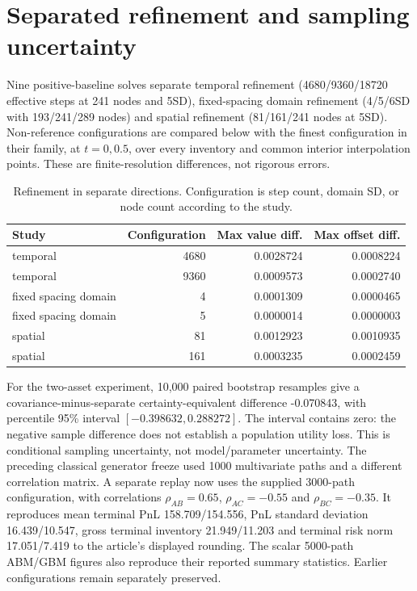 \section{Separated refinement and sampling uncertainty}
Nine positive-baseline solves separate temporal refinement (4680/9360/18720 effective steps at 241 nodes and 5SD), fixed-spacing domain refinement (4/5/6SD with 193/241/289 nodes) and spatial refinement (81/161/241 nodes at 5SD). Non-reference configurations are compared below with the finest configuration in their family, at $t=0,0.5$, over every inventory and common interior interpolation points. These are finite-resolution differences, not rigorous errors.
\begin{table}[ht]\centering\small
\begin{tabular}{lrrr}\toprule Study & Configuration & Max value diff. & Max offset diff.\\\midrule
temporal & 4680 & 0.0028724 & 0.0008224 \\
temporal & 9360 & 0.0009573 & 0.0002740 \\
fixed spacing domain & 4 & 0.0001309 & 0.0000465 \\
fixed spacing domain & 5 & 0.0000014 & 0.0000003 \\
spatial & 81 & 0.0012923 & 0.0010935 \\
spatial & 161 & 0.0003235 & 0.0002459 \\
\bottomrule\end{tabular}
\caption{Refinement in separate directions. Configuration is step count, domain SD, or node count according to the study.}
\end{table}
For the two-asset experiment, 10,000 paired bootstrap resamples give a covariance-minus-separate certainty-equivalent difference -0.070843, with percentile 95\% interval $[-0.398632,0.288272]$. The interval contains zero: the negative sample difference does not establish a population utility loss. This is conditional sampling uncertainty, not model/parameter uncertainty.
The preceding classical generator freeze used 1000 multivariate paths and a different correlation matrix. A separate replay now uses the supplied 3000-path configuration, with correlations $\rho_{AB}=0.65$, $\rho_{AC}=-0.55$ and $\rho_{BC}=-0.35$. It reproduces mean terminal PnL 158.709/154.556, PnL standard deviation 16.439/10.547, gross terminal inventory 21.949/11.203 and terminal risk norm 17.051/7.419 to the article's displayed rounding. The scalar 5000-path ABM/GBM figures also reproduce their reported summary statistics. Earlier configurations remain separately preserved.

